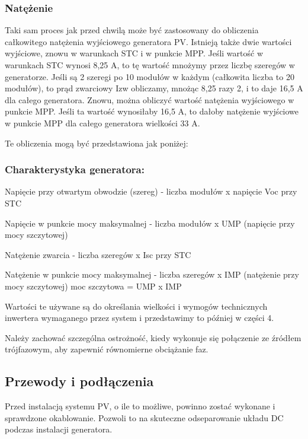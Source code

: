 \documentclass[12pt,a4paper]{article}
\begin{document}
 
\subsubsection{Natężenie}

Taki sam proces jak przed chwilą może być zastosowany do obliczenia 
całkowitego natężenia wyjściowego generatora PV. Istnieją także dwie 
wartości wyjściowe, znowu w warunkach STC i w punkcie MPP. Jeśli wartość 
w warunkach STC wynosi 8,25 A, to tę wartość mnożymy przez liczbę 
szeregów w generatorze. Jeśli są 2 szeregi po 10 modułów w każdym 
(całkowita liczba to 20 modułów), to prąd zwarciowy Izw obliczamy, mnożąc 8,25 
razy 2, i to daje 16,5 A dla całego generatora. Znowu, można obliczyć 
wartość natężenia wyjściowego w punkcie MPP. Jeśli ta wartość wynosiłaby 
16,5 A, to dałoby natężenie wyjściowe w punkcie MPP dla całego 
generatora wielkości 33 A. 


Te obliczenia mogą być przedstawiona jak poniżej: 

\subsubsection{Charakterystyka generatora: }

Napięcie przy otwartym obwodzie (szereg) - liczba modułów x napięcie Voc 
przy STC 

Napięcie w punkcie mocy maksymalnej - liczba modułów x UMP (napięcie 
przy mocy szczytowej) 

Natężenie zwarcia - liczba szeregów x Isc przy STC 

Natężenie w punkcie mocy maksymalnej - liczba szeregów x IMP (natężenie 
przy mocy szczytowej) moc szczytowa = UMP x IMP 


Wartości te używane są do określania wielkości i wymogów technicznych 
inwertera wymaganego przez system i przedstawimy to później w części 4. 

Należy zachować szczególna ostrożność, kiedy wykonuje się połączenie ze 
źródłem trójfazowym, aby zapewnić równomierne obciążanie faz. 

 

\subsection{Przewody i podłączenia}


Przed instalacją systemu PV, o ile to możliwe, powinno zostać wykonane i 
sprawdzone okablowanie. Pozwoli to na skuteczne odseparowanie układu DC 
podczas instalacji generatora. 
\end{document}
